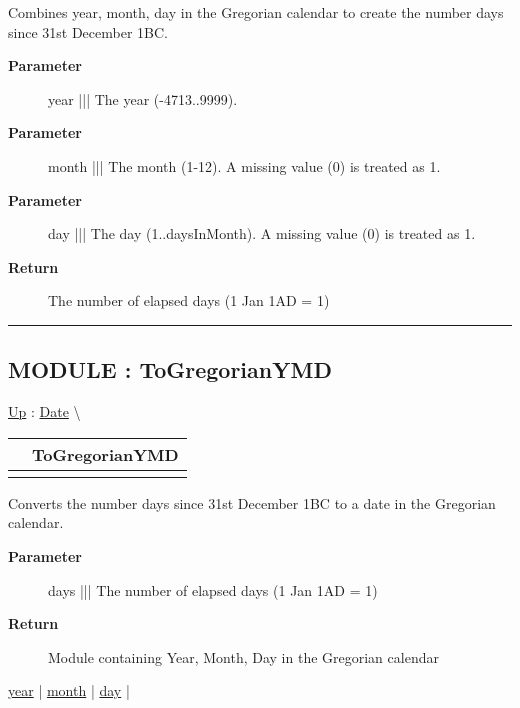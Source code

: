 \par
Combines year, month, day in the Gregorian calendar to create the number days since 31st December 1BC.

\par
\begin{description}
\item [\textbf{Parameter}] year ||| The year (-4713..9999).
\item [\textbf{Parameter}] month ||| The month (1-12). A missing value (0) is treated as 1.
\item [\textbf{Parameter}] day ||| The day (1..daysInMonth). A missing value (0) is treated as 1.
\item [\textbf{Return}] The number of elapsed days (1 Jan 1AD = 1)
\end{description}

\rule{\linewidth}{0.5pt}
\subsection*{MODULE : ToGregorianYMD}
\hypertarget{ecldoc:date.togregorianymd}{}
\hyperlink{ecldoc:Date}{Up} :
\hspace{0pt} \hyperlink{ecldoc:Date}{Date} \textbackslash 

{\renewcommand{\arraystretch}{1.5}
\begin{tabularx}{\textwidth}{|>{\raggedright\arraybackslash}l|X|}
\hline
\hspace{0pt} & ToGregorianYMD \\
\hline
\multicolumn{2}{|>{\raggedright\arraybackslash}X|}{\hspace{0pt}(Days\_t days)} \\
\hline
\end{tabularx}
}

\par
Converts the number days since 31st December 1BC to a date in the Gregorian calendar.

\par
\begin{description}
\item [\textbf{Parameter}] days ||| The number of elapsed days (1 Jan 1AD = 1)
\item [\textbf{Return}] Module containing Year, Month, Day in the Gregorian calendar
\end{description}

\hyperlink{ecldoc:date.togregorianymd.result.year}{year}  |
\hyperlink{ecldoc:date.togregorianymd.result.month}{month}  |
\hyperlink{ecldoc:date.togregorianymd.result.day}{day}  |

